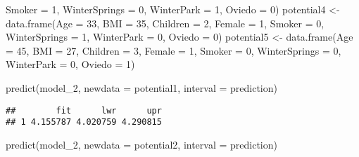 \documentclass[
]{article}
\newenvironment{Shaded}{\begin{snugshade}}{\end{snugshade}}
\newcommand{\AttributeTok}[1]{\textcolor[rgb]{0.77,0.63,0.00}{#1}}
\newcommand{\DecValTok}[1]{\textcolor[rgb]{0.00,0.00,0.81}{#1}}
\newcommand{\FunctionTok}[1]{\textcolor[rgb]{0.00,0.00,0.00}{#1}}
\newcommand{\NormalTok}[1]{#1}
\newcommand{\OtherTok}[1]{\textcolor[rgb]{0.56,0.35,0.01}{#1}}
\newcommand{\StringTok}[1]{\textcolor[rgb]{0.31,0.60,0.02}{#1}}
\begin{document}
\begin{Shaded}
\begin{Highlighting}[]
                            \AttributeTok{Smoker =} \DecValTok{1}\NormalTok{,}
                            \AttributeTok{WinterSprings =} \DecValTok{0}\NormalTok{,}
                            \AttributeTok{WinterPark =} \DecValTok{1}\NormalTok{,}
                            \AttributeTok{Oviedo =} \DecValTok{0}\NormalTok{)}
\NormalTok{potential4 }\OtherTok{\textless{}{-}} \FunctionTok{data.frame}\NormalTok{(}\AttributeTok{Age =} \DecValTok{33}\NormalTok{,}
                            \AttributeTok{BMI =} \DecValTok{35}\NormalTok{,}
                            \AttributeTok{Children =} \DecValTok{2}\NormalTok{,}
                            \AttributeTok{Female =} \DecValTok{1}\NormalTok{,}
                            \AttributeTok{Smoker =} \DecValTok{0}\NormalTok{,}
                            \AttributeTok{WinterSprings =} \DecValTok{1}\NormalTok{,}
                            \AttributeTok{WinterPark =} \DecValTok{0}\NormalTok{,}
                            \AttributeTok{Oviedo =} \DecValTok{0}\NormalTok{)}
\NormalTok{potential5 }\OtherTok{\textless{}{-}} \FunctionTok{data.frame}\NormalTok{(}\AttributeTok{Age =} \DecValTok{45}\NormalTok{,}
                            \AttributeTok{BMI =} \DecValTok{27}\NormalTok{,}
                            \AttributeTok{Children =} \DecValTok{3}\NormalTok{,}
                            \AttributeTok{Female =} \DecValTok{1}\NormalTok{,}
                            \AttributeTok{Smoker =} \DecValTok{0}\NormalTok{,}
                            \AttributeTok{WinterSprings =} \DecValTok{0}\NormalTok{,}
                            \AttributeTok{WinterPark =} \DecValTok{0}\NormalTok{,}
                            \AttributeTok{Oviedo =} \DecValTok{1}\NormalTok{)}

\FunctionTok{predict}\NormalTok{(model\_2, }\AttributeTok{newdata =}\NormalTok{ potential1, }\AttributeTok{interval =} \StringTok{\textquotesingle{}prediction\textquotesingle{}}\NormalTok{)}
\end{Highlighting}
\end{Shaded}

\begin{verbatim}
##        fit      lwr      upr
## 1 4.155787 4.020759 4.290815
\end{verbatim}

\begin{Shaded}
\begin{Highlighting}[]
\FunctionTok{predict}\NormalTok{(model\_2, }\AttributeTok{newdata =}\NormalTok{ potential2, }\AttributeTok{interval =} \StringTok{\textquotesingle{}prediction\textquotesingle{}}\NormalTok{)}
\end{Highlighting}
\end{Shaded}
\end{document}
